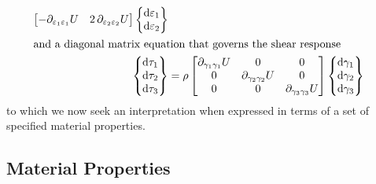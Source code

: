 \begin{subequations}
\begin{align}
\begin{bmatrix}
    - \partial_{\varepsilon_1 \varepsilon_1} U & 2 \, \partial_{\varepsilon_2 \varepsilon_2} U 
    \end{bmatrix}
    \left\{ \begin{matrix}
    \mathrm{d} \varepsilon_1 \\ \mathrm{d} \varepsilon_2 
    \end{matrix} \right\} \\
    \intertext{and a diagonal matrix equation that governs the shear response}
    \left\{ \begin{matrix} 
    \mathrm{d} \tau_1 \\ \mathrm{d} \tau_2 \\ \mathrm{d} \tau_3
    \end{matrix} \right\} & = \rho \begin{bmatrix}
    \partial_{\gamma_1\gamma_1} U & 0 & 0 \\
    0 & \partial_{\gamma_2\gamma_2} U & 0 \\
    0 & 0 & \partial_{\gamma_3\gamma_3} U
    \end{bmatrix}
    \left\{ \begin{matrix}
    \mathrm{d} \gamma_1 \\ \mathrm{d} \gamma_2 \\ \mathrm{d} \gamma_3
    \end{matrix} \right\}
    \end{align}
\end{subequations}
to which we now seek an interpretation when expressed in terms of a set of specified material properties.

\subsection{Material Properties}
\label{secMaterialConstants3D}

